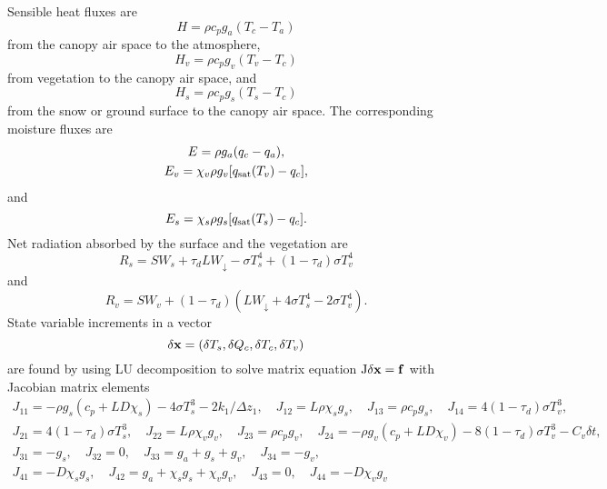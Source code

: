 \documentclass[fleqn]{article}
\begin{document}
Sensible heat fluxes are
\begin{equation}
H = \rho c_p g_a(T_c - T_a)
\end{equation}
from the canopy air space to the atmosphere,
\begin{equation}
H_v = \rho c_p g_v(T_v - T_c)
\end{equation}
from vegetation to the canopy air space, and
\begin{equation}
H_s = \rho c_p g_s(T_s - T_c)
\end{equation}
from the snow or ground surface to the canopy air space. The corresponding moisture fluxes are
\begin{gather}
E = \rho g_a(q_c - q_a), \\
E_v = \chi_v\rho g_v[q_{\rm sat}(T_v) - q_c],
\end{gather}
and
\begin{equation}
E_s = \chi_s\rho g_s[q_{\rm sat}(T_s) - q_c].
\end{equation}
Net radiation absorbed by the surface and the vegetation are
\begin{equation}
R_s = SW_s + \tau_d LW_\downarrow - \sigma T_s^4 + (1-\tau_d)\sigma T_v^4 
\end{equation}
and
\begin{equation}
R_v = SW_v + (1 - \tau_d)(LW_\downarrow + 4\sigma T_s^4 - 2\sigma T_v^4).
\end{equation}
State variable increments in a vector
\begin{equation}
{\bf \delta x} = (\delta T_s, \delta Q_c, \delta T_c, \delta T_v)
\end{equation} 
are found by using LU decomposition to solve matrix equation ${\rm J}{\bf \delta x} = {\bf f}$ with Jacobian matrix elements
\begin{gather}
J_{11} = -\rho g_s(c_p+LD\chi_s) - 4\sigma T_s^3 - 2k_1/\Delta z_1, \quad
J_{12} = L\rho\chi_s g_s, \quad J_{13} = \rho c_p g_s, \quad J_{14} = 4(1 - \tau_d)\sigma T_v^3, \nonumber \\
J_{21} = 4(1 - \tau_d)\sigma T_s^3, \quad J_{22} = L\rho\chi_v g_v, \quad J_{23} = \rho c_p g_v, \nonumber \quad
J_{24} = -\rho g_v(c_p+LD\chi_v) - 8(1-\tau_d)\sigma T_v^3 - C_v \delta t, \nonumber \\
J_{31} = -g_s, \quad J_{32} = 0, \quad J_{33} = g_a+g_s+g_v, \quad J_{34} = -g_v, \nonumber \\
J_{41} = -D\chi_s g _s, \quad J_{42} = g_a +\chi_s g_s + \chi_v g_v, \quad J_{43} = 0, \quad J_{44} = -D\chi_v g_v
\end{gather}
\end{document}
